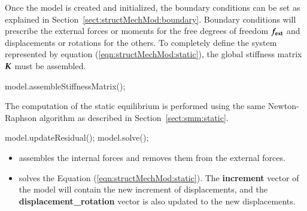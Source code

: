 Once the model is created and initialized, the boundary conditions can
be set as explained in Section~\ref{sect:structMechMod:boundary}.
Boundary conditions will prescribe the external forces or moments for
the free degrees of freedom $\boldsymbol{f_{{\mathrm{ext}}}}$ and displacements or
rotations for the others.  To completely define the system represented
by equation (\ref{eqn:structMechMod:static}), the global stiffness
matrix $\boldsymbol{K}$ must be assembled.

\begin{cpp}
  model.assembleStiffnessMatrix();
\end{cpp}

The computation of the static equilibrium is performed using the same
Newton-Raphson algorithm as described in
Section~\ref{sect:smm:static}.


\begin{cpp}
  model.updateResidual();
  model.solve();
\end{cpp}

\begin{itemize}

\item {} assembles the internal forces and
  removes them from the external forces.
\item {} solves the Equation (\ref{eqn:structMechMod:static}).
  The \textbf{increment} vector of the model will contain the new
  increment of displacements, and the \textbf{displacement\_rotation}
  vector is also updated to the new displacements.

\end{itemize}


